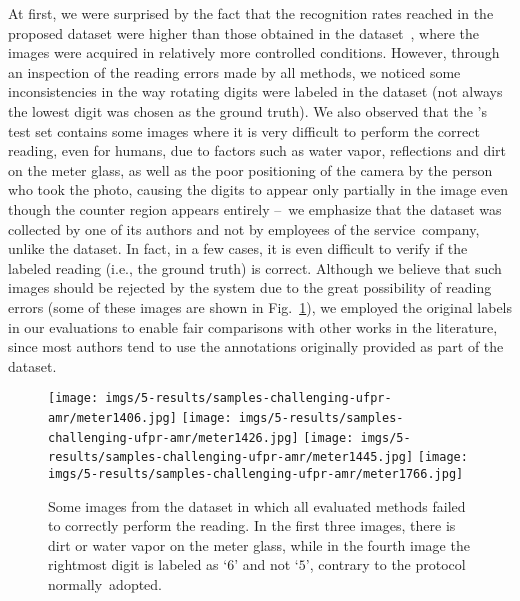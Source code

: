 At first, we were surprised by the fact that the recognition rates reached in the proposed dataset were higher than those obtained in the \ufpramr dataset~\cite{laroca2019convolutional}, where the images were acquired in relatively more controlled conditions.
However, through an inspection of the reading errors made by all methods, we noticed some inconsistencies in the way rotating digits were labeled in the \ufpramr dataset (not always the lowest digit was chosen as the ground truth).
We also observed that the \ufpramr's test set contains some images where it is very difficult to perform the correct reading, even for humans, due to factors such as water vapor, reflections and dirt on the meter glass, as well as the poor positioning of the camera by the person who took the photo, causing the digits to appear only partially in the image even though the counter region appears entirely --~we emphasize that the \ufpramr dataset was collected by one of its authors and not by employees of the service~company, unlike the \dataset dataset.
In fact, in a few cases, it is even difficult to verify if the labeled reading (i.e., the ground truth) is correct.
Although we believe that such images should be rejected by the system due to the great possibility of reading errors (some of these images are shown in Fig.~\ref{fig:samples-challenging-ufpr-amr}), we employed the original labels in our evaluations to enable fair comparisons with other works in the literature, since most authors tend to use the annotations originally provided as part of the dataset.

\begin{figure}[!htb]
    \centering
    \texttt{[image: imgs/5-results/samples-challenging-ufpr-amr/meter1406.jpg]} 
    \texttt{[image: imgs/5-results/samples-challenging-ufpr-amr/meter1426.jpg]} 
    \texttt{[image: imgs/5-results/samples-challenging-ufpr-amr/meter1445.jpg]} 
    \texttt{[image: imgs/5-results/samples-challenging-ufpr-amr/meter1766.jpg]}
    
    \vspace{-1.25mm}
    
    \caption{\small Some images from the \ufpramr dataset in which all evaluated methods failed to correctly perform the reading.
    In the first three images, there is dirt or water vapor on the meter glass, while in the fourth image the rightmost digit is labeled as `$6$' and not `$5$', contrary to the protocol normally~adopted.}
    \label{fig:samples-challenging-ufpr-amr}
\end{figure}

